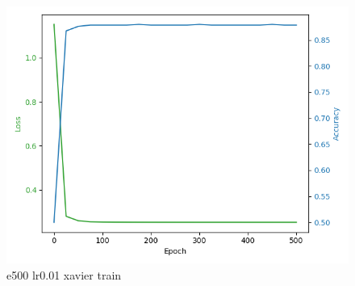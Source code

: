 \documentclass[8pt]{article}
\begin{document}
\begin{figure}[H]
\begin{minipage}{0.32\textwidth}
    \end{minipage}
    \begin{minipage}{0.32\textwidth}
        \centering
        \includegraphics[width=\textwidth]{../Prob4/out/1024_173617/e500_lr0.01_btz16_xavier/training_process.png}
        \caption{e500 lr0.01 xavier train}
        \label{fig:e500 lr0.01 xavier train}
    \end{minipage}
\end{figure}
\end{document}
